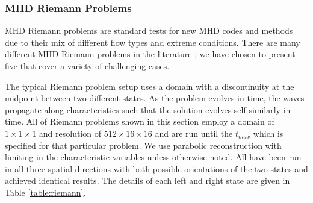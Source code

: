 \documentclass[modern]{aastex631}
\begin{document}
\subsubsection{MHD Riemann Problems}
\label{sec:riemann}

MHD Riemann problems are standard tests for new MHD codes and methods due to their mix of different flow types and extreme conditions. There are many different MHD Riemann problems in the literature \citep{brio_wu_1988, einfeldt_1991, ryu_jones_1995, dai_woodward_1998}; we have chosen to present five that cover a variety of challenging cases.

The typical Riemann problem setup uses a domain with a discontinuity at the midpoint between two different states. As the problem evolves in time, the waves propagate along characteristics such that the solution evolves self-similarly in time. All of Riemann problems shown in this section employ a domain of $1\times1\times1$ and resolution of $512\times16\times16$ and are run until the $t_{max}$ which is specified for that particular problem. We use parabolic reconstruction with limiting in the characteristic variables unless otherwise noted. All have been run in all three spatial directions with both possible orientations of the two states and achieved identical results. The details of each left and right state are given in Table \ref{table:riemann}.

\end{document}
